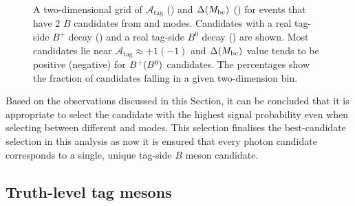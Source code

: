 \begin{figure}[htbp!]
    \centering
    \caption{\label{fig:selecting_tag_mode} A two-dimensional grid of $\mathcal{A}_{\mathrm{tag}}$ ()
    and $\Delta({M_{\mathrm{bc}}})$ () for events that have 2 $B$ candidates from \feiBp and \feiBz modes.
    Candidates with a real tag-side $B^+$ decay ()
    and a real tag-side $B^0$ decay () are shown.
    Most candidates lie near $\mathcal{A}_{\mathrm{tag}}\approx +1 (-1)$ and
    $\Delta({M_{\mathrm{bc}}})$ value tends to be positive (negative) for $B^+(B^0)$ candidates.
    The percentages show the fraction of candidates falling in a given two-dimension bin.
    }
\end{figure}

Based on the observations discussed in this Section, it can be concluded that it is appropriate to select the \FEI candidate with the highest signal probability even when selecting between different \feiBp and \feiBz modes.
This selection finalises the best-candidate selection in this analysis as now it is ensured that every photon candidate corresponds to a single, unique tag-side $B$ meson candidate.

\subsection{Truth-level tag \texorpdfstring{\B}{B} mesons}\label{sec:good_tag_definition}

